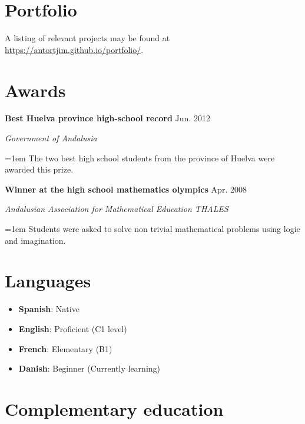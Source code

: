 \documentclass[paper=a4,fontsize=11pt]{article}
\newcommand{\sepspace}{\vspace*{1em}}		%
\newcommand{\NewPart}[1]{\section*{
{#1}}}
\newcommand{\Entry}[4]{
		\noindent \textbf{#1} \hfill      %
		\textsf{#2} \par                  %
		\noindent \textit{#3} \par        %
		  \noindent\hangindent=1em\hangafter=0 \small #4  %
		\normalsize \par \vspace{7.5pt}}
\begin{document}


\NewPart{Portfolio}

A listing of relevant projects may be found at \href{https://antortjim.github.io/portfolio/}{https://antortjim.github.io/portfolio/}.



\NewPart{Awards}{}

\Entry{Best Huelva province high-school record}{Jun. 2012}{Government of Andalusia}{
The two best high school students from the province of Huelva were awarded this prize.}
\sepspace

\Entry{Winner at the high school mathematics olympics}{Apr. 2008}{Andalusian Association for Mathematical Education THALES}{Students were asked to solve non trivial mathematical problems using logic and imagination.}


\NewPart{Languages}

\begin{multicols}{2}

\begin{itemize}
\item \textbf{Spanish}: Native
\item \textbf{English}: Proficient (C1 level)
\end{itemize}

\columnbreak

\begin{itemize}
\item \textbf{French}: Elementary (B1)
\item \textbf{Danish}: Beginner (Currently learning)
\end{itemize}

\end{multicols}

\thispagestyle{empty}
	

\NewPart{Complementary education}{}
\end{document}
